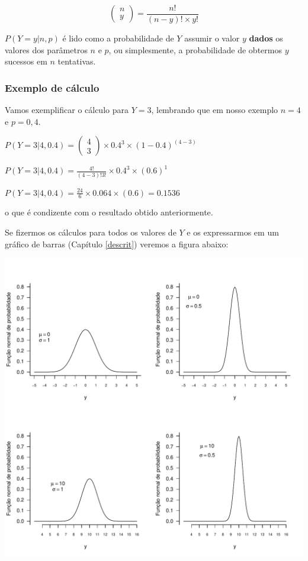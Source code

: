 \documentclass[
]{book}
\begin{document}
\[\left (\begin{array}{c}
n \\
y
\end{array}\right) = \frac{n!}{(n-y)! \times y!}\]

\(P(Y = y|n,p)\) é lido como a probabilidade de \(Y\) assumir o valor \(y\) \textbf{dados} os valores dos parâmetros \(n\) e \(p\), ou simplesmente, a probabilidade de obtermos \(y\) sucessos em \(n\) tentativas.

\hypertarget{exemplo-de-cuxe1lculo}{%
\subsubsection{Exemplo de cálculo}\label{exemplo-de-cuxe1lculo}}

Vamos exemplificar o cálculo para \(Y = 3\), lembrando que em nosso exemplo \(n = 4\) e \(p = 0,4\).

\(P(Y = 3|4,0.4) = \left (\begin{array}{c} 4 \\ 3 \end{array}\right) \times 0.4^3 \times (1-0.4)^{(4-3)}\)

\(P(Y = 3|4,0.4) = \frac{4!}{(4-3)!3!} \times 0.4^3 \times (0.6)^{1}\)

\(P(Y = 3|4,0.4) = \frac{24}{6} \times 0.064 \times (0.6) = 0.1536\)

o que é condizente com o resultado obtido anteriormente.

Se fizermos os cálculos para todos os valores de \(Y\) e os expressarmos em um gráfico de barras (Capítulo \ref{descrit}) veremos a figura abaixo:

\begin{center}\includegraphics{probest-cambientais_files/figure-latex/unnamed-chunk-204-1} \end{center}
\end{document}
